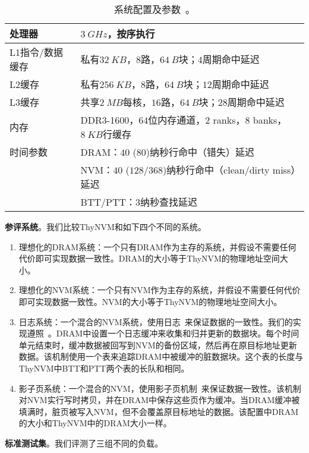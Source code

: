 \begin{table}[!h]
\centering
\caption{系统配置及参数~\cite{Lee:2009:APC:1555754.1555758}。}
\label{table:config}
\begin{tabular}{l|l}
\toprule[1.5pt]
处理器 & $3~GHz$，按序执行 \\
\hline
L1指令/数据缓存 & 私有$32~KB$，$8$路，$64~B$块；$4$周期命中延迟 \\
L2缓存 & 私有$256~KB$，$8$路，$64~B$块；$12$周期命中延迟 \\
L3缓存 & 共享$2~MB$每核，$16$路，$64~B$块；$28$周期命中延迟 \\
\hline
内存 & DDR3-1600，$64$位内存通道，$2$ ranks，$8$ banks，$8~KB$行缓存 \\
时间参数 & DRAM：$40$ ($80$)纳秒行命中（错失）延迟 \\
               & NVM：$40$ ($128$/$368$)纳秒行命中（clean/dirty miss）延迟 \\
               & BTT/PTT：$3$纳秒查找延迟 \\
\toprule[1.5pt]
\end{tabular}
\end{table}

\textbf{参评系统}。我们比较ThyNVM和如下四个不同的系统。
\begin{enumerate}
\item 理想化的DRAM系统：一个只有DRAM作为主存的系统，并假设不需要任何代价即可实现数据一致性。DRAM的大小等于ThyNVM的物理地址空间大小。 
\item 理想化的NVM系统：一个只有NVM作为主存的系统，并假设不需要任何代价即可实现数据一致性。NVM的大小等于ThyNVM的物理地址空间大小。 
\item 日志系统：一个混合的NVM系统，使用日志~\cite{DeWitt:1984:ITM:602259.602261, Hagmann:1987:RCF:41457.37518,
ext4}来保证数据的一致性。我们的实现遵照~\cite{Remzi:Journaling}。DRAM中设置一个日志缓冲来收集和归并更新的数据块。每个时间单元结束时，缓冲数据被回写到NVM的备份区域，然后再在原目标地址更新数据。该机制使用一个表来追踪DRAM中被缓冲的脏数据块。这个表的长度与ThyNVM中BTT和PTT两个表的长队和相同。 
\item 影子页系统：一个混合的NVM，使用影子页机制~\cite{bernstein2009principles}来保证数据一致性。该机制对NVM实行写时拷贝，并在DRAM中保存这些页作为缓冲。当DRAM缓冲被填满时，脏页被写入NVM，但不会覆盖原目标地址的数据。该配置中DRAM的大小和ThyNVM中的DRAM大小一样。
\end{enumerate}
 
\textbf{标准测试集}。我们评测了三组不同的负载。


